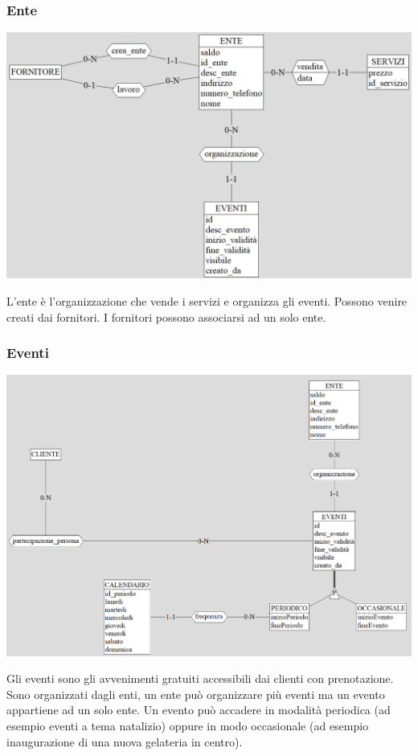 \subsubsection{Ente}
\begin{center}
\includegraphics[width=0.95\columnwidth]{images/Ente.png}
\end{center}
L'ente è l'organizzazione che vende i servizi e organizza gli eventi. Possono venire creati dai fornitori. 
I fornitori possono associarsi ad un solo ente.


\subsubsection{Eventi}
\begin{center}
\includegraphics[width=0.95\columnwidth]{images/Eventi.png}
\end{center}
Gli eventi sono gli avvenimenti gratuiti accessibili dai clienti con prenotazione.
Sono organizzati dagli enti, un ente può organizzare più eventi ma un evento appartiene ad un solo ente.
Un evento può accadere in modalità periodica (ad esempio eventi a tema natalizio) oppure in modo occasionale (ad esempio inaugurazione di una nuova gelateria in centro).


